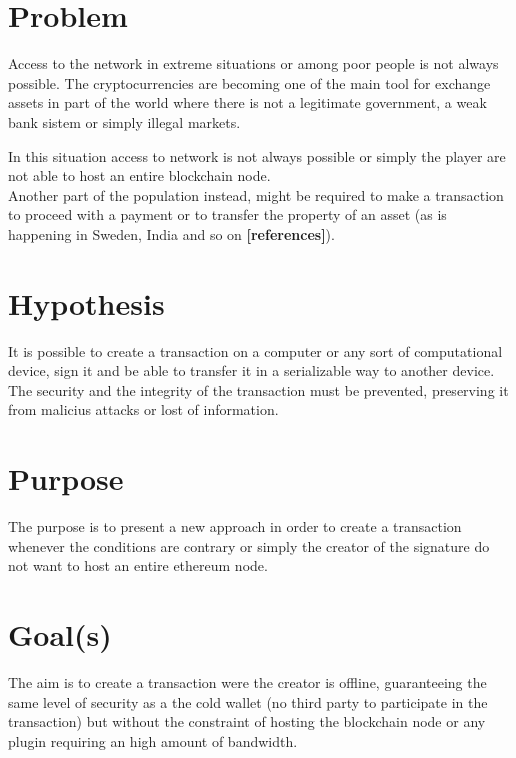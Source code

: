 \documentclass[paper=a4, fontsize=11pt]{scrartcl} %
\numberwithin{equation}{section} %
\numberwithin{figure}{section} %
\numberwithin{table}{section} %
\begin{document}
\section{Problem}

Access to the network in extreme situations or among poor people is not always possible. The cryptocurrencies are becoming one of the main tool for exchange assets in part of the world where there is not a legitimate government, a weak bank sistem or simply illegal markets.

In this situation access to network is not always possible or simply the player are not able to host an entire blockchain node. \\

Another part of the population instead, might be required to make a transaction to proceed with a payment or to transfer the property of an asset (as is happening in Sweden, India and so on \textbf{[references]}).

\section{Hypothesis}
It is possible to create a transaction on a computer or any sort of computational device, sign it and be able to transfer it in a serializable way to another device. \\

The security and the integrity of the transaction must be prevented, preserving it from malicius attacks or lost of information.

\section{Purpose}

The purpose is to present a new approach in order to create a transaction whenever the conditions are contrary or simply the creator of the signature do not want to host an entire ethereum node.


\section{Goal(s)}

The aim is to create a transaction were the creator is offline, guaranteeing the same level of security as a the cold wallet (no third party to participate in the transaction) but without the constraint of hosting the blockchain node or any plugin requiring an high amount of bandwidth.
\end{document}
